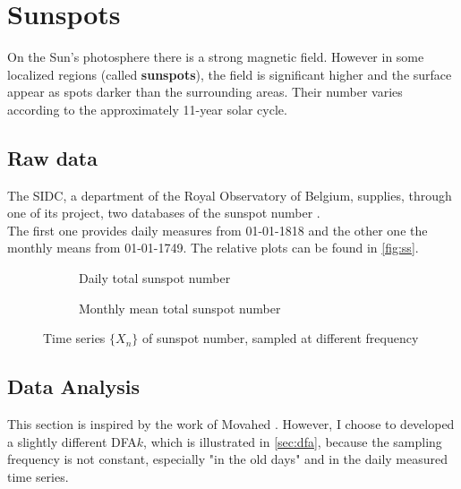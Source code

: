\graphicspath{{../sunSpots/img/}}
\section{Sunspots}
On the Sun's photosphere there is a strong magnetic field. However in some localized regions (called \textbf{sunspots}), the field is significant higher and the surface appear as spots darker than the surrounding areas. Their number varies according to the approximately 11-year solar cycle. 

\subsection{Raw data}
The SIDC, a department of the Royal Observatory of Belgium, supplies, through one of its project, two databases of the sunspot number \cite{sidc}. \\
The first one provides daily measures from 01-01-1818 and the other one the monthly means from 01-01-1749. The relative plots can be found in \autoref{fig:ss}.

\begin{figure}[!h]
	\centering
	\begin{subfigure}{0.48\textwidth}
		\centering
		
		\caption{Daily total sunspot number}\label{fig:dailyss}
	\end{subfigure}
	\hfill
	\begin{subfigure}{0.48\textwidth}
		\centering
		
		\caption{Monthly mean total sunspot number}\label{fig:monthlyss}
	\end{subfigure}
\caption{Time series $\{X_n\}$ of sunspot number, sampled at different frequency}\label{fig:ss}
\end{figure}

\subsection{Data Analysis}
This section is inspired by the work of Movahed \etal\cite{Movahed_2006}. However, I choose to developed a slightly different DFA$k$, which is illustrated in \autoref{sec:dfa}, because the sampling frequency is not constant, especially "in the old days" and in the daily measured time series. 

